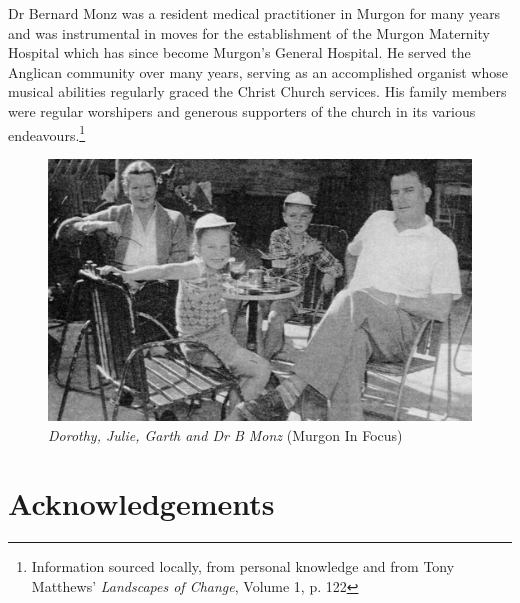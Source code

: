 Dr Bernard Monz was a resident medical practitioner in Murgon for many years and was instrumental in moves for the establishment of the Murgon Maternity Hospital which has since become Murgon's General Hospital. He served the Anglican community over many years, serving as an accomplished organist whose musical abilities regularly graced the Christ Church services. His family members were regular worshipers and generous supporters of the church in its various endeavours.\footnote{Information sourced locally, from personal knowledge and from Tony Matthews' \emph{Landscapes of Change}, Volume 1, p. 122}








\begin{figure}
\begin{center}
\includegraphics[width=1.\linewidth,center]{../images/monz.jpg}
\caption{{\itshape Dorothy, Julie, Garth and Dr B Monz} {\scriptsize(Murgon In Focus)}}
\end{center}
\end{figure}




\printendnotes[custom]
\setcounter{endnote}{0}


\chapter{Acknowledgements}
\nobalance








